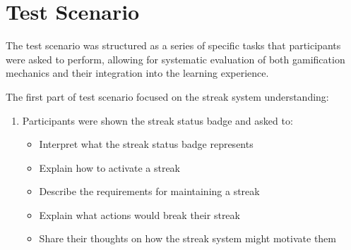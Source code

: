 

\section{Test Scenario}
\label{sec:test-scenario}
The test scenario was structured as a series of specific tasks that participants were asked to perform, allowing for systematic evaluation of both gamification mechanics and their integration into the learning experience.

The first part of test scenario focused on the streak system understanding:

\begin{enumerate}
    \item Participants were shown the streak status badge and asked to:
    \begin{itemize}
        \item Interpret what the streak status badge represents
        \item Explain how to activate a streak
        \item Describe the requirements for maintaining a streak
        \item Explain what actions would break their streak
        \item Share their thoughts on how the streak system might motivate them
    \end{itemize}
\end{enumerate}
    

